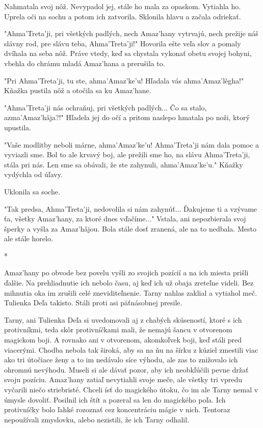 \documentclass{book}
\begin{document}
Nahmatala svoj nôž. Nevypadol jej, stále ho mala za opaskom. Vytiahla ho. Uprela oči na sochu a potom ich zatvorila. Sklonila hlavu a začala odriekať.

"$ $Ahma'Treta'ji, pri všetkých padlých, nech Amaz'hany vytrvajú, nech prežije náš slávny rod, pre slávu teba, Ahma'Treta'ji!"$ $ Hovorila ešte veľa slov a pomaly dvíhala na seba nôž. Práve vtedy, keď sa chystala vykonať obetu svojej bohyni, vbehla do chrámu mladá Amaz'hana a prerušila to.

"$ $Pri Ahma'Treta'ji, tu ste, ahma'Amaz'ke'u! Hľadala vás ahma'Amaz'le\v{}gha!"$ $ Kňažka pustila nôž a otočila sa ku Amaz'hane.

"$ $Ahma'Treta'ji nás ochraňuj, pri všetkých padlých... Čo sa stalo, azma'Amaz'ha\v{}ja?!"$ $ Hľadela jej do očí a pritom naslepo hmatala po noži, ktorý upustila.

"$ $Vaše modlitby neboli márne, ahma'Amaz'ke'u! Ahma'Treta'ji nám dala pomoc a vyviazli sme. Bol to ale krvavý boj, ale prežili sme ho, na slávu Ahma'Treta'ji, stála pri nás. Len sme sa obávali, že ste zahynuli, ahma'Amaz'ke'u."$ $ Kňažky vydýchla od úľavy.

Uklonila sa soche.

"$ $Tak predsa, Ahma'Treta'ji, nedovolila si nám zahynúť... Ďakujeme ti a vzývame ťa, všetky Amaz'hany, za ktoré dnes vďačíme..."$ $ Vstala, ani nepozbierala svoj šperky a vyšla za Amaz'ha\v{}jou. Bola stále dosť zranená, ale na to nedbala. Mesto ale stále horelo.

\begin{center}
*
\end{center}

Amaz'hany po obvode bez povelu vyšli zo svojich pozícií a na ich miesta prišli ďalšie. Na prehliadnutie ich nebolo času, aj keď ich už obaja zreteľne videli. Bez mihnutia oka im zrušili celé zneviditeľnenie. Tarny nahlas zaklial a vytiahol meč. Tulienka Deľa takisto. Stáli proti asi päťnásobnej presile.

Tarny, ani Tulienka Deľa si uvedomovali aj z chabých skúseností, ktoré s ich protivníkmi, teda skôr protivníčkami mali, že nemajú šancu v otvorenom magickom boji. A rovnako ani v otvorenom, akomkoľvek boji, keď stáli pred viacerými. Chodba nebola tak široká, aby sa na ňu na šírku z kúziel zmestili viac ako tri útočiace ženy a to im nedávalo síce výhodu, ale zas to znižovalo ich ohromnú nevýhodu. Museli si ale dávať pozor, aby ich neobkľúčili pevne držať svoju pozíciu. Amaz'hany zatiaľ nevytiahli svoje meče, ale všetky tri vpredu vyčarili niečo striebristé. Chceli ísť do magického útoku, čo im ale Tarny nemal v úmysle dovoliť. Posilnil ich štít a pozeral sa len do magického poľa. Ich protivníčky bolo ľahké rozoznať cez koncentráciu mágie v nich. Tentoraz nepoužívali zmyslovku, alebo nezistili, že ich Tarny odhalil.
\end{document}
